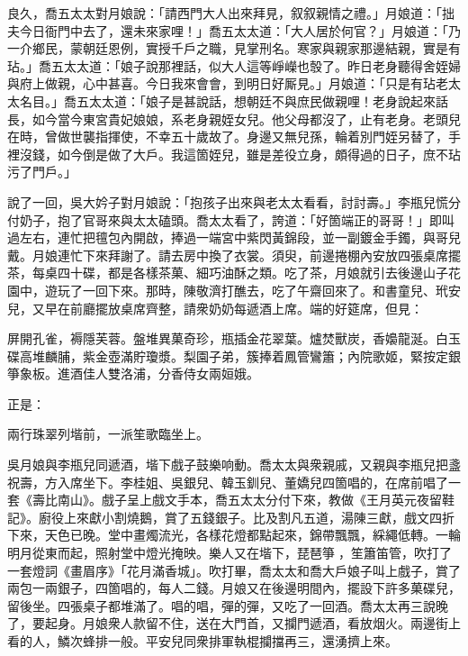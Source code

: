 良久，喬五太太對月娘說：「請西門大人出來拜見，叙叙親情之禮。」月娘道：「拙夫今日衙門中去了，還未來家哩！」喬五太太道：「大人居於何官？」月娘道：「乃一介鄉民，蒙朝廷恩例，實授千戶之職，見掌刑名。寒家與親家那邊結親，實是有玷。」喬五太太道：「娘子說那裡話，似大人這等崢嶸也彀了。昨日老身聽得舍姪婦與府上做親，心中甚喜。今日我來會會，到明日好厮見。」月娘道：「只是有玷老太太名目。」喬五太太道：「娘子是甚說話，想朝廷不與庶民做親哩！老身說起來話長，如今當今東宮貴妃娘娘，系老身親姪女兒。他父母都沒了，止有老身。老頭兒在時，曾做世襲指揮使，不幸五十歲故了。身邊又無兒孫，輪着別門姪另替了，手裡沒錢，如今倒是做了大戶。我這箇姪兒，雖是差役立身，頗得過的日子，庶不玷污了門戶。」

說了一回，吳大妗子對月娘說：「抱孩子出來與老太太看看，討討壽。」李瓶兒慌分付奶子，抱了官哥來與太太磕頭。喬太太看了，誇道：「好箇端正的哥哥！」即叫過左右，連忙把氊包內開啟，捧過一端宮中紫閃黃錦段，並一副鍍金手鐲，與哥兒戴。月娘連忙下來拜謝了。請去房中換了衣裳。須臾，前邊捲棚內安放四張桌席擺茶，每桌四十碟，都是各樣茶菓、細巧油酥之類。吃了茶，月娘就引去後邊山子花園中，遊玩了一回下來。那時，陳敬濟打醮去，吃了午齋回來了。和書童兒、玳安兒，又早在前廳擺放桌席齊整，請衆奶奶每遞酒上席。端的好筵席，但見：

\begin{myquote}
屏開孔雀，褥隱芙蓉。盤堆異菓奇珍，瓶插金花翠葉。爐焚獸炭，香嬝龍涎。白玉碟高堆麟脯，紫金壺滿貯瓊漿。梨園子弟，簇捧着鳳管鸞簫；內院歌姬，緊按定銀箏象板。進酒佳人雙洛浦，分香侍女兩姮娥。
\end{myquote}

正是：

\begin{myquote}
兩行珠翠列堦前，一派笙歌臨坐上。
\end{myquote}

吳月娘與李瓶兒同遞酒，堦下戲子鼓樂响動。喬太太與衆親戚，又親與李瓶兒把盞祝壽，方入席坐下。李桂姐、吳銀兒、韓玉釧兒、董嬌兒四箇唱的，在席前唱了一套《壽比南山》。戲子呈上戲文手本，喬五太太分付下來，教做《王月英元夜留鞋記》。{}廚役上來獻小割燒鵝，賞了五錢銀子。比及割凡五道，湯陳三獻，戲文四折下來，天色已晚。堂中畫燭流光，各樣花燈都點起來，錦帶飄飄，綵繩低轉。一輪明月從東而起，照射堂中燈光掩映。樂人又在堦下，琵琶箏𥱧，笙簫笛管，吹打了一套燈詞《畫眉序》「花月滿香城」。吹打畢，喬太太和喬大戶娘子叫上戲子，賞了兩包一兩銀子，四箇唱的，每人二錢。月娘又在後邊明間內，擺設下許多菓碟兒，留後坐。四張桌子都堆滿了。唱的唱，彈的彈，又吃了一回酒。喬太太再三說晚了，要起身。月娘衆人款留不住，送在大門首，又攔門遞酒，看放烟火。兩邊街上看的人，鱗次蜂排一般。平安兒同衆排軍執棍攔擋再三，還湧擠上來。

